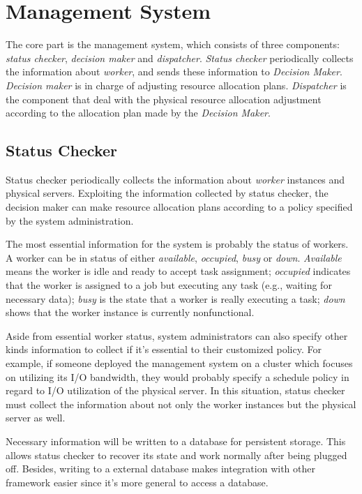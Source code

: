 \section{Management System}	%

The core part is the management system, which consists of three
components: \emph{status checker}, \emph{decision maker} and \emph{
dispatcher}.
\emph{Status checker} periodically collects the information about \emph{
worker}, and sends these information to \emph{Decision Maker}.
\emph{Decision maker} is in charge of adjusting resource allocation
plans.
\emph{Dispatcher} is the component that deal with the physical resource
allocation adjustment according to the allocation plan made by the \emph{
Decision Maker}.


\subsection{Status Checker}	%

Status checker periodically collects the information about \emph{worker}
instances and physical servers.
Exploiting the information collected by status checker, the decision
maker can make resource allocation plans according to a policy specified
by the system administration.

The most essential information for the system is probably the status of
workers.
A worker can be in status of either \emph{available}, \emph{occupied},
\emph{busy} or \emph{down}.
\emph{Available} means the worker is idle and ready to accept task
assignment; \emph{occupied} indicates that the worker is assigned to a
job but executing any task (e.g., waiting for necessary data); \emph{
busy} is the state that a worker is really executing a task; \emph{down}
shows that the worker instance is currently nonfunctional. 

Aside from essential worker status, system administrators can also
specify other kinds information to collect if it's essential to  their
customized policy.
For example, if someone deployed the management system on a cluster
which focuses on utilizing its I/O bandwidth, they would probably
specify a schedule policy in regard to I/O utilization of the physical
server.
In this situation, status checker must collect the information about not
only the worker instances but the physical server as well.

Necessary information will be written to a database for persistent
storage.
This allows status checker to recover its state and work normally after
being plugged off.
Besides, writing to a external database makes integration with other
framework easier since it's more general to access a database.

